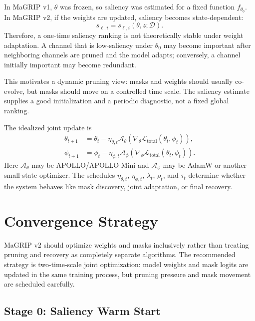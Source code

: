 \documentclass[11pt]{article}
\newcommand{\Loss}{\mathcal{L}}
\newcommand{\Data}{\mathcal{D}}
\begin{document}
In MaGRIP v1, $\theta$ was frozen, so saliency was estimated for a fixed function $f_{\theta_0}$. In MaGRIP v2, if the weights are updated, saliency becomes state-dependent:
\begin{equation}
  s_{\ell,i} = s_{\ell,i}(\theta,z;\Data).
\end{equation}
Therefore, a one-time saliency ranking is not theoretically stable under weight adaptation. A channel that is low-saliency under $\theta_0$ may become important after neighboring channels are pruned and the model adapts; conversely, a channel initially important may become redundant.

This motivates a dynamic pruning view: masks and weights should usually co-evolve, but masks should move on a controlled time scale. The saliency estimate supplies a good initialization and a periodic diagnostic, not a fixed global ranking.

The idealized joint update is
\begin{align}
  \theta_{t+1}
  &=
  \theta_t
  -
  \eta_{\theta,t}
  \mathcal{A}_{\theta}
  \left(
    \nabla_{\theta}\Loss_{\mathrm{total}}(\theta_t,\phi_t)
  \right),
  \label{eq:joint-theta-update}
  \\
  \phi_{t+1}
  &=
  \phi_t
  -
  \eta_{\phi,t}
  \mathcal{A}_{\phi}
  \left(
    \nabla_{\phi}\Loss_{\mathrm{total}}(\theta_t,\phi_t)
  \right).
  \label{eq:joint-phi-update}
\end{align}
Here $\mathcal{A}_{\theta}$ may be APOLLO/APOLLO-Mini and $\mathcal{A}_{\phi}$ may be AdamW or another small-state optimizer. The schedules $\eta_{\theta,t}$, $\eta_{\phi,t}$, $\lambda_t$, $\rho_t$, and $\tau_t$ determine whether the system behaves like mask discovery, joint adaptation, or final recovery.

\section{Convergence Strategy}

MaGRIP v2 should optimize weights and masks inclusively rather than treating pruning and recovery as completely separate algorithms. The recommended strategy is two-time-scale joint optimization: model weights and mask logits are updated in the same training process, but pruning pressure and mask movement are scheduled carefully.

\subsection{Stage 0: Saliency Warm Start}
\end{document}
